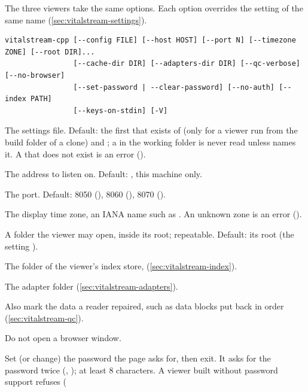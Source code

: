 The three viewers take the same options. Each option overrides the setting of the same name
(\cref{sec:vitalstream-settings}).

\begin{lstlisting}[style=signature]
vitalstream-cpp [--config FILE] [--host HOST] [--port N] [--timezone ZONE] [--root DIR]...
                [--cache-dir DIR] [--adapters-dir DIR] [--qc-verbose] [--no-browser]
                [--set-password | --clear-password] [--no-auth] [--index PATH]
                [--keys-on-stdin] [-V]
\end{lstlisting}

\begin{params}
\item[--config FILE] The settings file. Default: the first that exists of
   (only for a viewer run from the build folder of a
  clone) and ; a
   in the working folder is never read unless  names it.
  A  that does not exist is an error ().
\item[--host HOST] The address to listen on. Default: , this machine only.
\item[--port N] The port. Default: 8050 (), 8060 (),
  8070 ().
\item[--timezone ZONE] The display time zone, an IANA name such as .
  An unknown zone is an error ().
\item[--root DIR] A folder the viewer may open, inside its root; repeatable. Default: its root
  (the setting ).
\item[--cache-dir DIR] The folder of the viewer's index store, 
  (\cref{sec:vitalstream-index}).
\item[--adapters-dir DIR] The adapter folder (\cref{sec:vitalstream-adapters}).
\item[--qc-verbose] Also mark the data a reader repaired, such as data blocks put back in order
  (\cref{sec:vitalstream-qc}).
\item[--no-browser] Do not open a browser window.
\item[--set-password] Set (or change) the password the page asks for, then exit. It asks for the
  password twice (, ); at least 8 characters.
  A viewer built without password support refuses (
\end{params}
